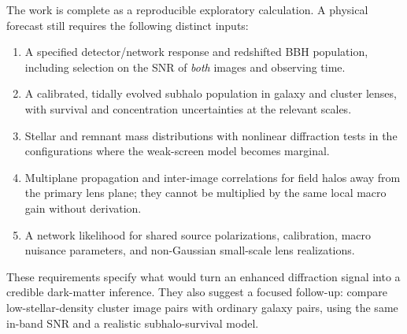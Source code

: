 \documentclass[11pt]{article}
\begin{document}
The work is complete as a reproducible exploratory calculation. A physical
forecast still requires the following distinct inputs:
\begin{enumerate}
\item A specified detector/network response and redshifted BBH population,
including selection on the SNR of \emph{both} images and observing time.
\item A calibrated, tidally evolved subhalo population in galaxy and cluster
lenses, with survival and concentration uncertainties at the relevant scales.
\item Stellar and remnant mass distributions with nonlinear diffraction tests
in the configurations where the weak-screen model becomes marginal.
\item Multiplane propagation and inter-image correlations for field halos
away from the primary lens plane; they cannot be multiplied by the same
local macro gain without derivation.
\item A network likelihood for shared source polarizations, calibration,
macro nuisance parameters, and non-Gaussian small-scale lens realizations.
\end{enumerate}

These requirements specify what would turn an enhanced diffraction signal into
a credible dark-matter inference. They also suggest a focused follow-up:
compare low-stellar-density cluster image pairs with ordinary galaxy pairs,
using the same in-band SNR and a realistic subhalo-survival model.



\end{document}
